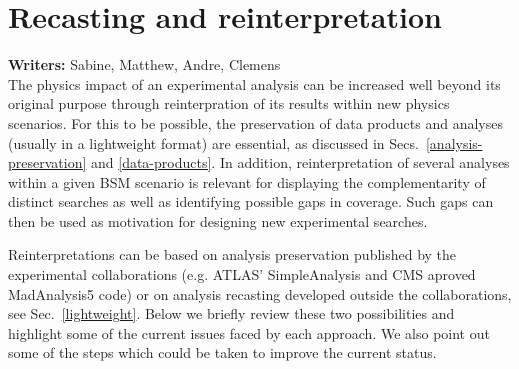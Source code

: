 \documentclass[11pt]{article}
\begin{document}



\section{Recasting and reinterpretation}
\label{reinterpret}

\noindent\textbf{Writers:} Sabine, Matthew, Andre, Clemens\\

The physics impact of an experimental analysis can be increased well beyond its original purpose through reinterpration of its results within new physics scenarios.
For this to be possible, the preservation of data products and analyses (usually in a lightweight format) are essential, as discussed in Secs.~\ref{analysis-preservation} and \ref{data-products}.
In addition, reinterpretation of several analyses within a given BSM scenario is relevant for displaying the complementarity of distinct searches as well as identifying possible gaps in coverage.
Such gaps can then be used as motivation for designing new experimental searches.


Reinterpretations can be based on analysis preservation published by the experimental collaborations (e.g. ATLAS' SimpleAnalysis and CMS aproved MadAnalysis5 code) or on analysis recasting developed outside the collaborations, see Sec.~\ref{lightweight}. Below we briefly review these two possibilities and highlight some of the current issues faced by each approach.
We also point out some of the steps which could be taken to improve the current status.


\end{document}
